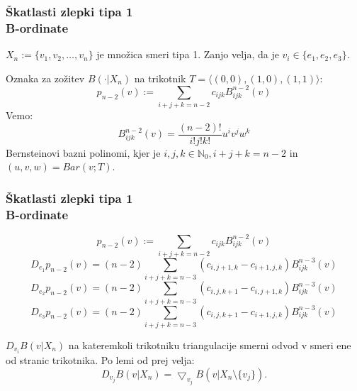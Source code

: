 \documentclass{beamer}
\begin{document}
\begin{frame}
\frametitle{Škatlasti zlepki tipa 1 \\ B-ordinate}

$X_n := \{v_1, v_2, \ldots , v_n\}$ je množica smeri tipa 1. Zanjo velja, da je $v_i \in \{e_1, e_2, e_3\}.$

\vspace{3mm}
Oznaka za zožitev $B(\cdot | X_n)$ na trikotnik $T = \langle (0,0), (1, 0), (1,1)\rangle$:\\
$$p_{n-2} (v) := \sum_{i+j+k=n-2} c_{ijk} B_{ijk}^{n-2}(v)$$
\vspace{3mm}
Vemo: 
$$B_{ijk}^{n-2}(v) = \frac{(n-2)!}{i! j! k!} u^i v^j w^k$$
Bernsteinovi bazni polinomi, kjer je $i, j, k \in \mathbb{N}_0, i+j+k=n-2$ in $(u,v, w ) = Bar(v; T).$
\end{frame}


\begin{frame}
\frametitle{Škatlasti zlepki tipa 1 \\ B-ordinate}
\small
$$p_{n-2} (v) := \sum_{i+j+k=n-2} c_{ijk} B_{ijk}^{n-2}(v)$$
\normalsize
$$D_{e_1} p_{n-2} (v) = (n-2)\sum_{i+j+k=n-3} (c_{i,j+1,k} - c_{i+1, j, k}) B_{ijk}^{n-3}(v)$$
$$D_{e_2} p_{n-2} (v) = (n-2)\sum_{i+j+k=n-3} (c_{i,j,k+1} - c_{i, j+1, k}) B_{ijk}^{n-3}(v)$$
$$D_{e_3} p_{n-2} (v) = (n-2)\sum_{i+j+k=n-3} (c_{i,j,k+1} - c_{i+1, j, k}) B_{ijk}^{n-3}(v)$$

\vspace{3mm}
$D_{v_i} B(v|X_n)$ na kateremkoli trikotniku triangulacije smerni odvod v smeri ene od stranic trikotnika. Po lemi od prej velja: $$D_{v_j} B(v|X_n) = \bigtriangledown_{v_j} B(v | X_n \setminus \{v_j\}).$$
\end{frame}


\end{document}

